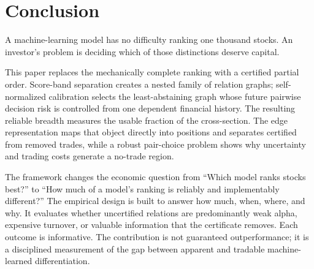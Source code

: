 \section{Conclusion}

A machine-learning model has no difficulty ranking one thousand stocks. An investor's problem is deciding which of those distinctions deserve capital.

This paper replaces the mechanically complete ranking with a certified partial order. Score-band separation creates a nested family of relation graphs; self-normalized calibration selects the least-abstaining graph whose future pairwise decision risk is controlled from one dependent financial history. The resulting reliable breadth measures the usable fraction of the cross-section. The edge representation maps that object directly into positions and separates certified from removed trades, while a robust pair-choice problem shows why uncertainty and trading costs generate a no-trade region.

The framework changes the economic question from ``Which model ranks stocks best?'' to ``How much of a model's ranking is reliably and implementably different?'' The empirical design is built to answer how much, when, where, and why. It evaluates whether uncertified relations are predominantly weak alpha, expensive turnover, or valuable information that the certificate removes. Each outcome is informative. The contribution is not guaranteed outperformance; it is a disciplined measurement of the gap between apparent and tradable machine-learned differentiation.

